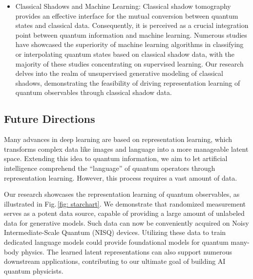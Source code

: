 \documentclass[fleqn,11pt]{wlscirep}
\newcommand{\figref}[1]{Fig.\,\ref{#1}}
\begin{document}
\begin{itemize}
\item Classical Shadows and Machine Learning: Classical shadow tomography provides an effective interface for the mutual conversion between quantum states and classical data. Consequently, it is perceived as a crucial integration point between quantum information and machine learning. Numerous studies \cite{Li2020V2012.08288, Huang2021P2011.01938, Huang2021I2101.02464, Huang2021P2106.12627, Huang2022Q2112.00778, Van-Kirk2022H2212.06084, Wei2023N2305.01078, Jerbi2023S2306.00061} have showcased the superiority of machine learning algorithms in classifying or interpolating quantum states based on classical shadow data, with the majority of these studies concentrating on supervised learning. Our research delves into the realm of unsupervised generative modeling of classical shadows, demonstrating the feasibility of driving representation learning of quantum observables through classical shadow data.
\end{itemize}

\subsection*{Future Directions}

Many advances in deep learning are based on representation learning, which transforms complex data like images and language into a more manageable latent space. Extending this idea to quantum information, we aim to let artificial intelligence comprehend the ``language'' of quantum operators through representation learning. However, this process requires a vast amount of data.

Our research showcases the representation learning of quantum observables, as illustrated in \figref{fig: starchart}. We demonstrate that randomized measurement serves as a potent data source, capable of providing a large amount of unlabeled data for generative models. Such data can now be conveniently acquired on Noisy Intermediate-Scale Quantum (NISQ)\cite{Preskill2018Q1801.00862} devices. Utilizing these data to train dedicated language models could provide foundational models for quantum many-body physics. The learned latent representations can also support numerous downstream applications, contributing to our ultimate goal of building AI quantum physicists.
\end{document}
